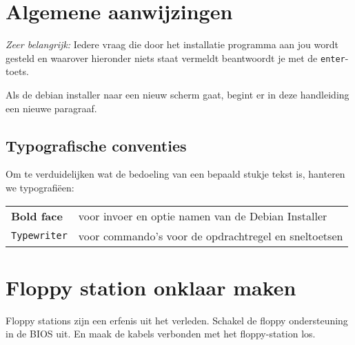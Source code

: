 \section{Algemene aanwijzingen}
\emph{Zeer belangrijk:} Iedere vraag die door het installatie programma aan jou wordt gesteld en waarover hieronder niets staat vermeldt beantwoordt je met de \texttt{enter}-toets.

Als de debian installer naar een nieuw scherm gaat, begint er in deze handleiding een nieuwe paragraaf.
\subsection{Typografische conventies}
Om te verduidelijken wat de bedoeling van een bepaald stukje tekst is, hanteren we typografi\"{e}en:
\begin{table}[H]
\begin{tabular}{l l}
	\textbf{Bold face} & voor invoer en optie namen van de Debian Installer\\
	\texttt{Typewriter} & voor commando's voor de opdrachtregel en sneltoetsen\\
\end{tabular}
\end{table}


\section{Floppy station onklaar maken}
Floppy stations zijn een erfenis uit het verleden. Schakel de floppy ondersteuning in de BIOS uit. En maak de kabels verbonden met het floppy-station los.


